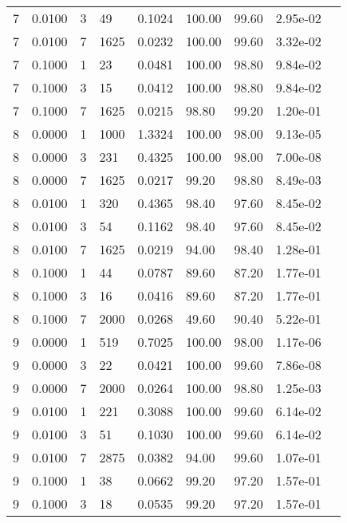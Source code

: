 \begin{longtable}{@{}lllllllll@{}}
7           & 0.0100 & 3   & 49     & 0.1024 & 100.00  & 99.60   & 2.95e-02  &  \\
7           & 0.0100 & 7   & 1625   & 0.0232 & 100.00  & 99.60   & 3.32e-02  &  \\
7           & 0.1000 & 1   & 23     & 0.0481 & 100.00  & 98.80   & 9.84e-02  &  \\
7           & 0.1000 & 3   & 15     & 0.0412 & 100.00  & 98.80   & 9.84e-02  &  \\
7           & 0.1000 & 7   & 1625   & 0.0215 & 98.80   & 99.20   & 1.20e-01  &  \\
8           & 0.0000 & 1   & 1000   & 1.3324 & 100.00  & 98.00   & 9.13e-05  &  \\
8           & 0.0000 & 3   & 231    & 0.4325 & 100.00  & 98.00   & 7.00e-08  &  \\
8           & 0.0000 & 7   & 1625   & 0.0217 & 99.20   & 98.80   & 8.49e-03  &  \\
8           & 0.0100 & 1   & 320    & 0.4365 & 98.40   & 97.60   & 8.45e-02  &  \\
8           & 0.0100 & 3   & 54     & 0.1162 & 98.40   & 97.60   & 8.45e-02  &  \\
8           & 0.0100 & 7   & 1625   & 0.0219 & 94.00   & 98.40   & 1.28e-01  &  \\
8           & 0.1000 & 1   & 44     & 0.0787 & 89.60   & 87.20   & 1.77e-01  &  \\
8           & 0.1000 & 3   & 16     & 0.0416 & 89.60   & 87.20   & 1.77e-01  &  \\
8           & 0.1000 & 7   & 2000   & 0.0268 & 49.60   & 90.40   & 5.22e-01  &  \\
9           & 0.0000 & 1   & 519    & 0.7025 & 100.00  & 98.00   & 1.17e-06  &  \\
9           & 0.0000 & 3   & 22     & 0.0421 & 100.00  & 99.60   & 7.86e-08  &  \\
9           & 0.0000 & 7   & 2000   & 0.0264 & 100.00  & 98.80   & 1.25e-03  &  \\
9           & 0.0100 & 1   & 221    & 0.3088 & 100.00  & 99.60   & 6.14e-02  &  \\
9           & 0.0100 & 3   & 51     & 0.1030 & 100.00  & 99.60   & 6.14e-02  &  \\
9           & 0.0100 & 7   & 2875   & 0.0382 & 94.00   & 99.60   & 1.07e-01  &  \\
9           & 0.1000 & 1   & 38     & 0.0662 & 99.20   & 97.20   & 1.57e-01  &  \\
9           & 0.1000 & 3   & 18     & 0.0535 & 99.20   & 97.20   & 1.57e-01  &  \\

\end{longtable}
